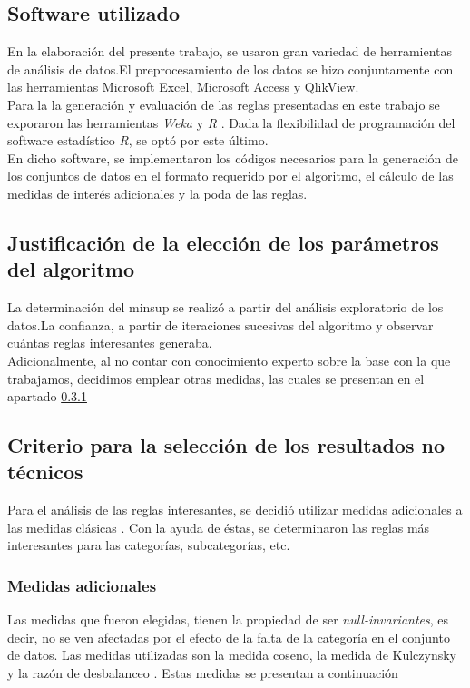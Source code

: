 \documentclass[]{article}
\begin{document}
\subsection{Software utilizado}
En la elaboración del presente trabajo, se usaron gran variedad de herramientas de análisis de datos.El preprocesamiento de los datos se hizo conjuntamente con las herramientas Microsoft Excel, Microsoft Access y QlikView.\\

Para la la generación y evaluación de las reglas presentadas en este trabajo se exporaron las herramientas \textit{Weka} \cite{Weka1} y \textit{R} \cite{RCran}. Dada la flexibilidad de programación del software estadístico \textit{R}, se optó por este último.\\
 
En dicho software, se implementaron los códigos necesarios para la generación de los conjuntos de datos en el formato requerido por el algoritmo, el cálculo de las medidas de interés adicionales y la poda de las reglas.

\subsection{Justificación de la elección de los parámetros del algoritmo}
La determinación del minsup se realizó a partir del análisis exploratorio de los datos.La confianza, a partir de iteraciones sucesivas del algoritmo y observar cuántas reglas interesantes generaba.\\

Adicionalmente, al no contar con conocimiento experto sobre la base con la que trabajamos, decidimos emplear otras medidas, las cuales se presentan en el apartado \ref{Medidas}

\subsection{Criterio para la selección de los resultados no técnicos}

Para el análisis de las reglas interesantes, se decidió utilizar medidas adicionales a las medidas clásicas \cite{Tan:2005:IDM:1095618}. Con la ayuda de éstas, se determinaron las reglas más interesantes para las categorías, subcategorías, etc. 

\subsubsection{Medidas adicionales} \label{Medidas}
Las medidas que fueron elegidas, tienen la propiedad de ser \textit{null-invariantes}, es decir, no se ven afectadas por el efecto de la falta de la categoría en el conjunto de datos. Las medidas utilizadas son la medida coseno, la medida de Kulczynsky y la razón de desbalanceo \cite{Hall:2009:WDM:1656274.1656278}. Estas medidas se presentan a continuación\\
\end{document}
